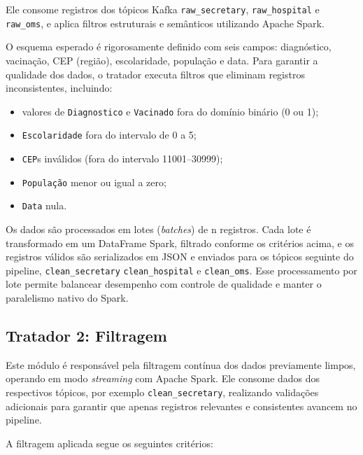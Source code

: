 \documentclass[a4paper,12pt]{article}
\begin{document}
Ele consome registros dos tópicos Kafka \texttt{raw\_secretary}, \texttt{raw\_hospital} e \texttt{raw\_oms}, e aplica filtros estruturais e semânticos utilizando Apache Spark.

O esquema esperado é rigorosamente definido com seis campos: diagnóstico, vacinação, CEP (região), escolaridade, população e data. Para garantir a qualidade dos dados, o tratador executa filtros que eliminam registros inconsistentes, incluindo:
\begin{itemize}
    \item valores de \texttt{Diagnostico} e \texttt{Vacinado} fora do domínio binário (0 ou 1);
    \item \texttt{Escolaridade} fora do intervalo de 0 a 5;
    \item \texttt{CEP}s inválidos (fora do intervalo 11001--30999);
    \item \texttt{População} menor ou igual a zero;
    \item \texttt{Data} nula.
\end{itemize}

Os dados são processados em lotes (\textit{batches}) de n registros. Cada lote é transformado em um DataFrame Spark, filtrado conforme os critérios acima, e os registros válidos são serializados em JSON e enviados para os tópicos seguinte do pipeline,  \texttt{clean\_secretary} \texttt{clean\_hospital} e \texttt{clean\_oms}. Esse processamento por lote permite balancear desempenho com controle de qualidade e manter o paralelismo nativo do Spark.




\subsection{Tratador 2: Filtragem}

Este módulo é responsável pela filtragem contínua dos dados previamente limpos, operando em modo \textit{streaming} com Apache Spark. Ele consome dados dos respectivos tópicos, por exemplo \texttt{clean\_secretary}, realizando validações adicionais para garantir que apenas registros relevantes e consistentes avancem no pipeline.

A filtragem aplicada segue os seguintes critérios:
\end{document}
